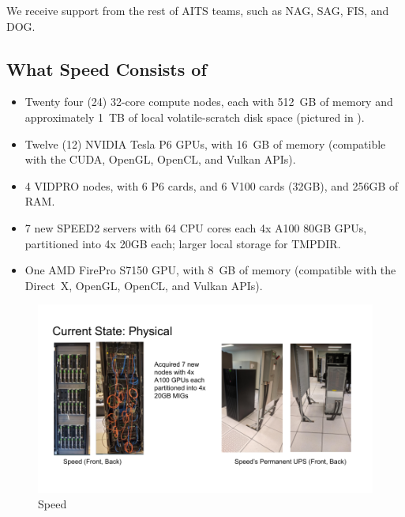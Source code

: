 \documentclass{easychair}
\begin{document}
\noindent
We receive support from the rest of AITS teams, such as NAG, SAG, FIS, and DOG.

\subsection{What Speed Consists of}
\label{sect:speed-arch}

\begin{itemize}
\item
Twenty four (24) 32-core compute nodes, each with 512~GB of memory and 
approximately 1~TB of local volatile-scratch disk space (pictured in ).

\item
Twelve (12) NVIDIA Tesla P6 GPUs, with 16~GB of memory (compatible with the 
CUDA, OpenGL, OpenCL, and Vulkan APIs). 

\item
4 VIDPRO nodes, with 6 P6 cards, and 6 V100 cards (32GB), and 
256GB of RAM.

\item
7 new SPEED2 servers with 64 CPU cores each 4x A100 80GB GPUs, partitioned
into 4x 20GB each; larger local storage for TMPDIR.

\item
One AMD FirePro S7150 GPU, with 8~GB of memory (compatible with the
Direct~X, OpenGL, OpenCL, and Vulkan APIs). 
\end{itemize}

\begin{figure}[htpb]
\includegraphics[width=\columnwidth]{images/speed-pics}
\caption{Speed}
\label{fig:speed-pics}
\end{figure}
\end{document}
